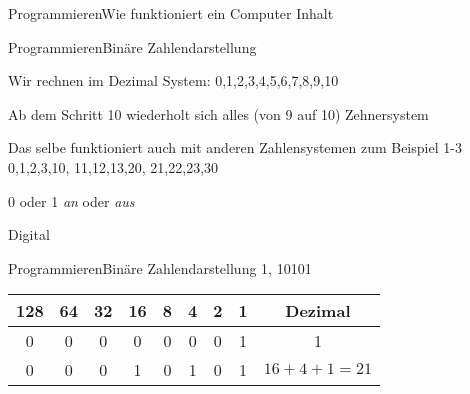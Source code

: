 

\begin{frame}{Programmieren}{Wie funktioniert ein Computer}
	Inhalt
\end{frame}


\begin{frame}{Programmieren}{Binäre Zahlendarstellung}

	Wir rechnen im Dezimal System:
	0,1,2,3,4,5,6,7,8,9,10 
	
	Ab dem Schritt 10 wiederholt sich alles (von 9 auf 10) Zehnersystem
	
	Das selbe funktioniert auch mit anderen Zahlensystemen zum Beispiel 1-3 
	0,1,2,3,10,
	11,12,13,20,
	21,22,23,30

	0 oder 1
	\emph{an} oder \textit{aus}
	
	Digital
	
\end{frame}

\begin{frame}{Programmieren}{Binäre Zahlendarstellung}
		1,
		10101
		
		\begin{tabular}{cccccccc|c}
		128 & 64 & 32 & 16 & 8 & 4 & 2 & 1 & Dezimal \\ \hline 
		0   & 0  & 0  & 0  & 0 & 0 & 0 & 1 & 1 \\ 
		0   & 0  & 0  & 1  & 0 & 1 & 0 & 1 & $16 + 4 + 1 = 21$ \\ 
		\hline 
		\end{tabular} 	
\end{frame}








